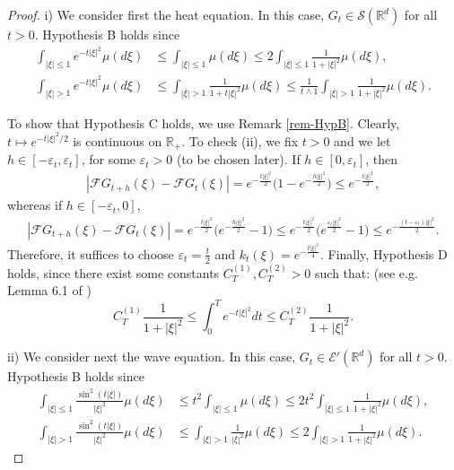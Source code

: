 \documentclass[12pt]{article}
\def\cE{\mathcal{E}}
\def\cF{\mathcal{F}}
\def\cS{\mathcal{S}}
\def\bR{\mathbb{R}}
\def\e{\varepsilon}
\begin{document}
\begin{proof}
i) We consider first the heat equation. In this case, $G_t \in \cS(\bR^d)$ for all $t>0$.
Hypothesis B holds since 
\begin{align*}
\int_{|\xi|\leq 1}e^{-t|\xi|^2}\mu(d\xi) & \leq \int_{|\xi|\leq 1}\mu(d\xi)\leq 2\int_{|\xi|\leq 1} \frac{1}{1+|\xi|^2}\mu(d\xi), \\
\int_{|\xi|> 1}e^{-t|\xi|^2}\mu(d\xi) & \leq \int_{|\xi|> 1}\frac{1}{1+t|\xi|^2}\mu(d\xi) \leq \frac{1}{t\wedge 1}\int_{|\xi|> 1} \frac{1}{1+|\xi|^2}\mu(d\xi).
\end{align*}

To show that Hypothesis C holds, we use Remark \ref{rem-HypB}. 
Clearly, $t \mapsto e^{-t|\xi|^2/2}$ is continuous on $\bR_{+}$. To check (ii),
we fix $t>0$ and we let $h \in [-\e_t,\e_t]$, for some $\e_t>0$ (to be chosen later). If $h \in [0,\e_t]$, then
\begin{align*}
|\cF G_{t+h}(\xi)-\cF G_t(\xi)|=e^{-\frac{t|\xi|^2}{2}} \big(1-e^{-\frac{h|\xi|^2}{2}} \big)\leq e^{-\frac{t|\xi|^2}{2}},
\end{align*}
whereas if $h \in [-\e_t,0]$,
\begin{align*}
|\cF G_{t+h}(\xi)-\cF G_t(\xi)|=e^{-\frac{t|\xi|^2}{2}} \big(e^{-\frac{h|\xi|^2}{2}} -1\big)\leq e^{-\frac{t|\xi|^2}{2}}\big(e^{\frac{\e_t|\xi|^2}{2}} -1\big)\leq e^{-\frac{(t-\e_t)|\xi|^2}{2}}.
\end{align*}
Therefore, it suffices to choose $\e_t=\frac{t}{2}$ and $k_t(\xi)=e^{-\frac{t|\xi|^2}{4}}$. Finally, Hypothesis D holds, since there exist some constants $C_T^{(1)},C_{T}^{(2)}>0$ such that: (see e.g. Lemma 6.1 of \cite{sanz05})
\[
C_{T}^{(1)} \frac{1}{1+|\xi|^2} \leq \int_0^T e^{-t|\xi|^2}dt \leq C_T^{(2)}\frac{1}{1+|\xi|^2}.
\]


ii) We consider next the wave equation. In this case, $G_t \in \cE'(\bR^d)$ for all $t>0$.
Hypothesis B holds since
\begin{align*}
\int_{|\xi|\leq 1}\frac{\sin^2(t|\xi|)}{|\xi|^2}\mu(d\xi) & \leq t^2 \int_{|\xi|\leq 1}\mu(d\xi)\leq 2t^2 \int_{|\xi|\leq 1} \frac{1}{1+|\xi|^2}\mu(d\xi), \\
\int_{|\xi|> 1} \frac{\sin^2(t|\xi|)}{|\xi|^2} \mu(d\xi) & \leq \int_{|\xi|> 1}\frac{1}{|\xi|^2}\mu(d\xi) \leq 2\int_{|\xi|> 1} \frac{1}{1+|\xi|^2}\mu(d\xi).
\end{align*}


\end{proof}
\end{document}
